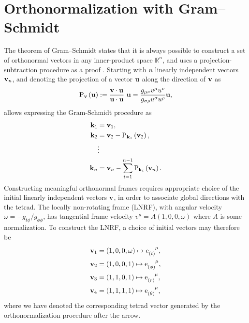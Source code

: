 \section{Orthonormalization with Gram--Schmidt}
\label{appendix:gram-schmidt}

The theorem of Gram--Schmidt states that it is always possible to construct a set of orthonormal vectors in any inner-product space $\mathbb{R}^n$, and uses a projection-subtraction procedure as a proof \citep{schmidt_uber_1989}. Starting with $n$ linearly independent vectors $\mathbf{v}_n$, and denoting the projection of a vector $\mathbf{u}$ along the direction of $\mathbf{v}$ as
\begin{equation}
\mathrm{P}_{\vector{v}}\left(\vector{u}\right) := \frac{\vector{v} \cdot \vector{u}}{\vector{u} \cdot \vector{u}}\ \vector{u} = \frac{g_{\mu\nu} v^\mu u^\nu}{g_{\sigma\rho} u^\sigma u^\rho} \vector{u},
\end{equation}
allows expressing the Gram-Schmidt procedure as
\begin{align}
    \mathbf{k}_1 &= \mathbf{v}_1, \nonumber \\
    \mathbf{k}_2 &= \mathbf{v}_2 - \mathrm{P}_{\mathbf{k}_1}\left(\mathbf{v}_2 \right), \nonumber \\
    &\vdots \nonumber \\
    \mathbf{k}_n &= \mathbf{v}_n - \sum_{i = 1}^{n-1} \mathrm{P}_{\mathbf{k}_i} \left(\mathbf{v}_n \right).
\end{align}
Constructing meaningful orthonormal frames requires appropriate choice of the initial linearly independent vectors $\mathbf{v}$, in order to associate global directions with the tetrad. The locally non-rotating frame (LNRF), with angular velocity $\omega = -g_{t\phi} / g_{\phi\phi}$, has tangential frame velocity $v^\mu = A (1, 0, 0, \omega)$ where $A$ is some normalization. To construct the LNRF, a choice of initial vectors may therefore be
\begin{align}
    \vector{v}_1 &= \left(1, 0, 0, \omega \right) \mapsto \dtensor{\e}{(t)}{\mu}, \nonumber \\
    \vector{v}_2 &= \left(1, 0, 0, 1\right) \mapsto \dtensor{\e}{(\phi)}{\mu}, \nonumber \\
    \vector{v}_3 &= \left(1, 1, 0, 1\right) \mapsto \dtensor{\e}{(r)}{\mu}, \nonumber \\
    \vector{v}_4 &= \left(1, 1, 1, 1\right) \mapsto \dtensor{\e}{(\theta)}{\mu},
\end{align}
where we have denoted the corresponding tetrad vector generated by the orthonormalization procedure after the arrow.

